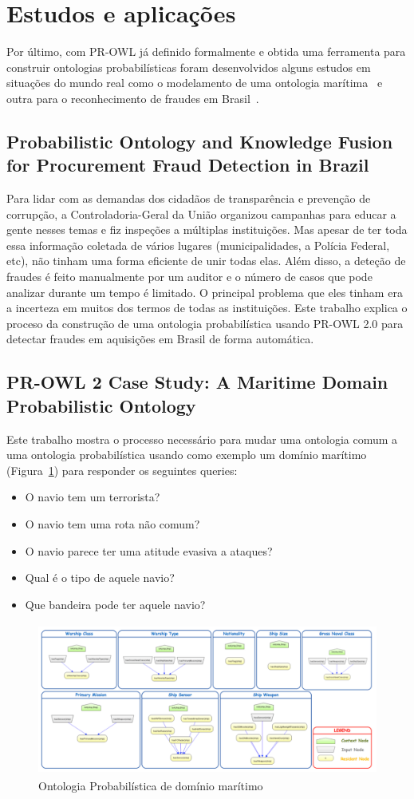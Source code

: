 \section{Estudos e aplicações}
\label{sec:applications}

Por último, com PR-OWL já definido formalmente e obtida uma ferramenta para construir ontologias probabilísticas foram desenvolvidos alguns estudos em situações do mundo real como o modelamento de uma ontologia marítima~\cite{Laskey11} e outra para o reconhecimento de fraudes em Brasil~\cite{Rommel13}.

\subsection{Probabilistic Ontology and Knowledge Fusion for Procurement Fraud Detection in Brazil}
\label{subsec:fraud}

Para lidar com as demandas dos cidadãos de transparência e prevenção de corrupção, a Controladoria-Geral da União organizou campanhas para educar a gente nesses temas e fiz inspeções a múltiplas instituições. Mas apesar de ter toda essa informação coletada de vários lugares (municipalidades, a Polícia Federal, etc), não tinham uma forma eficiente de unir todas elas. Além disso, a deteção de fraudes é feito manualmente por um auditor e o número de casos que pode analizar durante um tempo é limitado. O principal problema que eles tinham era a incerteza em muitos dos termos de todas as instituições. Este trabalho explica o proceso da construção de uma ontologia probabilística usando PR-OWL 2.0 para detectar fraudes em aquisições em Brasil de forma automática.

\subsection{PR-OWL 2 Case Study: A Maritime Domain Probabilistic Ontology}
\label{subsec:maritime}

Este trabalho mostra o processo necessário para mudar uma ontologia comum a uma ontologia probabilística usando como exemplo um domínio marítimo (Figura~\ref{fig:maritime}) para responder os seguintes queries:
\begin{itemize}
	\item O navio tem um terrorista?
	\item O navio tem uma rota não comum?
	\item O navio parece ter uma atitude evasiva a ataques?
	\item Qual é o tipo de aquele navio?
	\item Que bandeira pode ter aquele navio?
\end{itemize}

\begin{figure}[h]
	\centering
	\includegraphics[height=5cm]{./images/maritime}
	\caption{Ontologia Probabilística de domínio marítimo}
	\label{fig:maritime}
\end{figure}